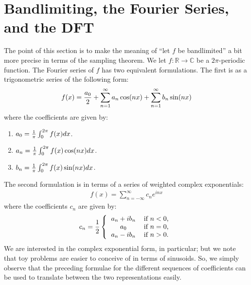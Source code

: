 \section{Bandlimiting, the Fourier Series, and the DFT}

The point of this section is to make the meaning of ``let $f$ be
bandlimited'' a bit more precise in terms of the sampling theorem. We
let $f : \mathbb{R} \to \mathbb{C}$ be a $2\pi$-periodic function. The
Fourier series of $f$ has two equivalent formulations. The first is as
a trigonometric series of the following form:
\begin{align} \label{eqn-fourier-series-sinusoid-rep}
  f(x) = {a_0 \over 2} + \sum_{n=1}^\infty a_n \cos(n x) + \sum_{n=1}^\infty b_n \sin(n x)
\end{align}
where the coefficients are given by:
\begin{enumerate}
\item $a_0 = {1 \over \pi} \int_0^{2\pi} f(x) dx$.
\item $a_n = {1 \over \pi} \int_0^{2\pi} f(x) \cos(nx) dx$.
\item $b_n = {1 \over \pi} \int_0^{2\pi} f(x) \sin(nx) dx$.
\end{enumerate}
The second formulation is in terms of a series of weighted complex
exponentials:
\begin{align*}
  f(x) = \sum_{n = -\infty}^\infty c_n e^{inx}
\end{align*}
where the coefficients $c_n$ are given by:
\begin{align*}
  c_n = {1 \over 2} \left\{ \begin{tabular}{cl}
                              $a_n + ib_n$ & if $n < 0$, \\
                              $a_0$ & if $n = 0$, \\
                              $a_n - ib_n$ & if $n > 0$. \\
                            \end{tabular} \right.
\end{align*}
We are interested in the complex exponential form, in particular; but
we note that toy problems are easier to conceive of in terms of
sinusoids. So, we simply observe that the preceding formulae for the
different sequences of coefficients can be used to translate between
the two representations easily.

